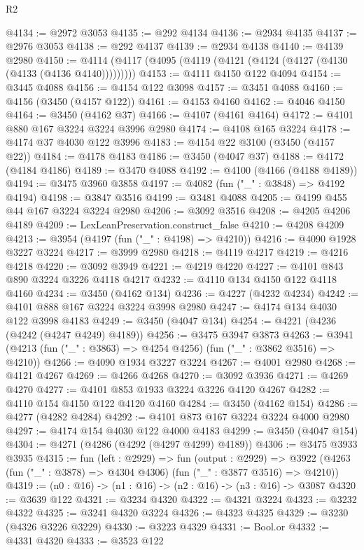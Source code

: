 \begin{lexlean}{R2}
\begin{coremodule}
@4134 := @2972 @3053
@4135 := @292 @4134
@4136 := @2934 @4135
@4137 := @2976 @3053
@4138 := @292 @4137
@4139 := @2934 @4138
@4140 := @4139 @2980
@4150 := @4114 (@4117 (@4095 (@4119 (@4121 (@4124 (@4127 (@4130 (@4133 (@4136 @4140)))))))))
@4153 := @4111 @4150 @122 @4094
@4154 := @3445 @4088
@4156 := @4154 @122 @3098
@4157 := @3451 @4088
@4160 := @4156 (@3450 (@4157 @122))
@4161 := @4153 @4160
@4162 := @4046 @4150
@4164 := @3450 (@4162 @37)
@4166 := @4107 (@4161 @4164)
@4172 := @4101 @880 @167 @3224 @3224 @3996 @2980
@4174 := @4108 @165 @3224
@4178 := @4174 @37 @4030 @122 @3996
@4183 := @4154 @22 @3100 (@3450 (@4157 @22))
@4184 := @4178 @4183
@4186 := @3450 (@4047 @37)
@4188 := @4172 (@4184 @4186)
@4189 := @3470 @4088
@4192 := @4100 (@4166 (@4188 @4189))
@4194 := @3475 @3960 @3858
@4197 := @4082 (fun ("_" : @3848) => @4192 @4194)
@4198 := @3847 @3516
@4199 := @3481 @4088
@4205 := @4199 @455 @44 @167 @3224 @3224 @2980
@4206 := @3092 @3516
@4208 := @4205 @4206 @4189
@4209 := LexLeanPreservation.construct_false
@4210 := @4208 @4209
@4213 := @3954 (@4197 (fun ("_" : @4198) => @4210))
@4216 := @4090 @1928 @3227 @3224
@4217 := @3999 @2980
@4218 := @4119 @4217
@4219 := @4216 @4218
@4220 := @3092 @3949
@4221 := @4219 @4220
@4227 := @4101 @843 @890 @3224 @3226 @4118 @4217
@4232 := @4110 @134 @4150 @122 @4118 @4160
@4234 := @3450 (@4162 @134)
@4236 := @4227 (@4232 @4234)
@4242 := @4101 @888 @167 @3224 @3224 @3998 @2980
@4247 := @4174 @134 @4030 @122 @3998 @4183
@4249 := @3450 (@4047 @134)
@4254 := @4221 (@4236 (@4242 (@4247 @4249) @4189))
@4256 := @3475 @3947 @3873
@4263 := @3941 (@4213 (fun ("_" : @3863) => @4254 @4256) (fun ("_" : @3862 @3516) => @4210))
@4266 := @4090 @1934 @3227 @3224
@4267 := @4001 @2980
@4268 := @4121 @4267
@4269 := @4266 @4268
@4270 := @3092 @3936
@4271 := @4269 @4270
@4277 := @4101 @853 @1933 @3224 @3226 @4120 @4267
@4282 := @4110 @154 @4150 @122 @4120 @4160
@4284 := @3450 (@4162 @154)
@4286 := @4277 (@4282 @4284)
@4292 := @4101 @873 @167 @3224 @3224 @4000 @2980
@4297 := @4174 @154 @4030 @122 @4000 @4183
@4299 := @3450 (@4047 @154)
@4304 := @4271 (@4286 (@4292 (@4297 @4299) @4189))
@4306 := @3475 @3933 @3935
@4315 := fun (left : @2929) =>
  fun (output : @2929) =>
  @3922 (@4263 (fun ("_" : @3878) => @4304 @4306) (fun ("_" : @3877 @3516) => @4210))
@4319 := (n0 : @16) -> (n1 : @16) -> (n2 : @16) -> (n3 : @16) -> @3087
@4320 := @3639 @122
@4321 := @3234 @4320
@4322 := @4321 @3224
@4323 := @3232 @4322
@4325 := @3241 @4320 @3224
@4326 := @4323 @4325
@4329 := @3230 (@4326 @3226 @3229)
@4330 := @3223 @4329
@4331 := Bool.or
@4332 := @4331 @4320
@4333 := @3523 @122

\end{coremodule}
\end{lexlean}
